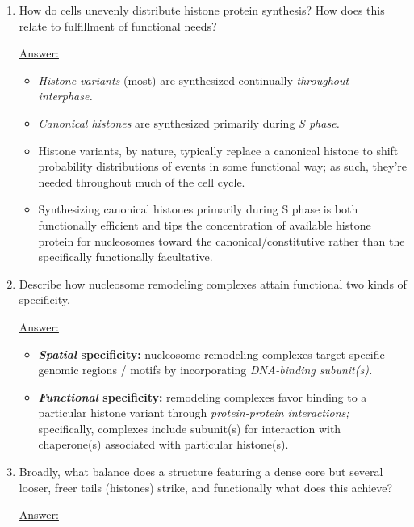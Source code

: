\documentclass{article}
\newenvironment{QandA}{\begin{enumerate}[label=\bfseries Q\arabic*.]}
                       {\end{enumerate}}
\newenvironment{answered}{\par\normalfont\underline{Answer:}}{}
\begin{document}
\begin{QandA}
    \begin{answered}
    H3K9me3 is most associated with (esp. constitutive) heterochromatin. \textbf{Linker histone H1} is recruited by this PTM.
    \end{answered}
  \item{How do cells unevenly distribute histone protein synthesis? How does this relate to fulfillment of functional needs?}
    \begin{answered}
    \begin{itemize}
      \item{\textit{Histone variants} (most) are synthesized continually \textit{throughout interphase.}}
      \item{\textit{Canonical histones} are synthesized primarily during \textit{S phase.}}
      \item{Histone variants, by nature, typically replace a canonical histone to shift probability distributions of events in some functional way; as such, they're needed throughout much of the cell cycle.}
      \item{Synthesizing canonical histones primarily during S phase is both functionally efficient and tips the concentration of available histone protein for nucleosomes toward the canonical/constitutive rather than the specifically functionally facultative.}
    \end{itemize}
    \end{answered}
  \item{Describe how nucleosome remodeling complexes attain functional two kinds of specificity.}
    \begin{answered}
    \begin{itemize}
      \item{\textbf{\textit{Spatial} specificity:} nucleosome remodeling complexes target specific genomic regions / motifs by incorporating \textit{DNA-binding subunit(s).}}
      \item{\textbf{\textit{Functional} specificity:} remodeling complexes favor binding to a particular histone variant through \textit{protein-protein interactions;} specifically, complexes include subunit(s) for interaction with chaperone(s) associated with particular histone(s).}
    \end{itemize}
    \end{answered}
  \item{Broadly, what balance does a structure featuring a dense core but several looser, freer tails (histones) strike, and functionally what does this achieve?}
    \begin{answered}

\end{answered}
\end{QandA}
\end{document}
